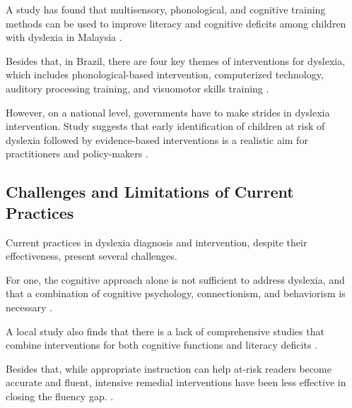 A study has found that multisensory, phonological, and cognitive training methods can be used to improve literacy and cognitive deficits among children with dyslexia in Malaysia \parencite{Anis2018}. 

Besides that, in Brazil, there are four key themes of interventions for dyslexia, which includes phonological-based intervention, computerized technology, auditory processing training, and visuomotor skills training \parencite{Signor2020}.

However, on a national level, governments have to make strides in dyslexia intervention. Study suggests that early identification of children at risk of dyslexia followed by evidence-based interventions is a realistic aim for practitioners and policy-makers 
\parencite{Snowling2012}. 

\newpage
\subsection{Challenges and Limitations of Current Practices}
Current practices in dyslexia diagnosis and intervention, despite their effectiveness, present several challenges. 

For one, the cognitive approach alone is not sufficient to address dyslexia, and that a combination of cognitive psychology, connectionism, and behaviorism is necessary \parencite{Tnnessen1999}.

A local study also finds that there is a lack of comprehensive studies that combine interventions for both cognitive functions and literacy deficits \parencite{Anis2018}. 

Besides that, while appropriate instruction can help at-risk readers become accurate and fluent, intensive remedial interventions have been less effective in closing the fluency gap. \parencite{Alexander2004}.



